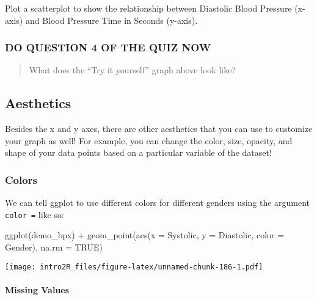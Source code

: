 \documentclass[
]{book}
\newenvironment{Shaded}{\begin{snugshade}}{\end{snugshade}}
\newcommand{\AttributeTok}[1]{\textcolor[rgb]{0.77,0.63,0.00}{#1}}
\newcommand{\ConstantTok}[1]{\textcolor[rgb]{0.00,0.00,0.00}{#1}}
\newcommand{\FunctionTok}[1]{\textcolor[rgb]{0.00,0.00,0.00}{#1}}
\newcommand{\NormalTok}[1]{#1}
\newcommand{\SpecialCharTok}[1]{\textcolor[rgb]{0.00,0.00,0.00}{#1}}
\begin{document}
Plot a scatterplot to show the relationship between Diastolic Blood Pressure (x-axis) and Blood Pressure Time in Seconds (y-axis).

\hypertarget{do-question-4-of-the-quiz-now-1}{%
\subsubsection{DO QUESTION 4 OF THE QUIZ NOW}\label{do-question-4-of-the-quiz-now-1}}

\begin{quote}
What does the ``Try it yourself'' graph above look like?
\end{quote}

\hypertarget{aesthetics}{%
\subsection{Aesthetics}\label{aesthetics}}

Besides the x and y axes, there are other aesthetics that you can use to customize your graph as well! For example, you can change the color, size, opacity, and shape of your data points based on a particular variable of the dataset!

\hypertarget{colors}{%
\subsubsection{Colors}\label{colors}}

We can tell ggplot to use different colors for different genders using the argument \texttt{color\ =} like so:

\begin{Shaded}
\begin{Highlighting}[]
\FunctionTok{ggplot}\NormalTok{(demo\_bpx) }\SpecialCharTok{+}
  \FunctionTok{geom\_point}\NormalTok{(}\FunctionTok{aes}\NormalTok{(}\AttributeTok{x =}\NormalTok{ Systolic,}
                 \AttributeTok{y =}\NormalTok{ Diastolic,}
                 \AttributeTok{color =}\NormalTok{ Gender), }
             \AttributeTok{na.rm =} \ConstantTok{TRUE}\NormalTok{)}
\end{Highlighting}
\end{Shaded}

\texttt{[image: intro2R\_files/figure-latex/unnamed-chunk-186-1.pdf]}

\hypertarget{missing-values-3}{%
\paragraph{Missing Values}\label{missing-values-3}}
\end{document}
